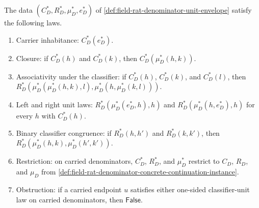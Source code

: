\begin{theorem}
\label{thm:field-rat-denominator-unit-envelope-monoid-laws}
The data
$(C_D^\ast,R_D^\ast,\mu_D^\ast,e_D^\ast)$ of
\autoref{def:field-rat-denominator-unit-envelope} satisfy the following laws.
\begin{enumerate}
  \item Carrier inhabitance: $C_D^\ast(e_D^\ast)$.
  \item Closure: if $C_D^\ast(h)$ and $C_D^\ast(k)$, then
  $C_D^\ast(\mu_D^\ast(h,k))$.
  \item Associativity under the classifier: if $C_D^\ast(h)$, $C_D^\ast(k)$,
  and $C_D^\ast(l)$, then
  $R_D^\ast(\mu_D^\ast(\mu_D^\ast(h,k),l),
  \mu_D^\ast(h,\mu_D^\ast(k,l)))$.
  \item Left and right unit laws:
  $R_D^\ast(\mu_D^\ast(e_D^\ast,h),h)$ and
  $R_D^\ast(\mu_D^\ast(h,e_D^\ast),h)$ for every $h$ with $C_D^\ast(h)$.
  \item Binary classifier congruence: if $R_D^\ast(h,h')$ and
  $R_D^\ast(k,k')$, then
  $R_D^\ast(\mu_D^\ast(h,k),\mu_D^\ast(h',k'))$.
  \item Restriction: on carried denominators, $C_D^\ast$, $R_D^\ast$, and
  $\mu_D^\ast$ restrict to $C_D$, $R_D$, and $\mu_D$ from
  \autoref{def:field-rat-denominator-concrete-continuation-instance}.
  \item Obstruction: if a carried endpoint $u$ satisfies either one-sided
  classifier-unit law on carried denominators, then $\mathsf{False}$.
\end{enumerate}
\end{theorem}
